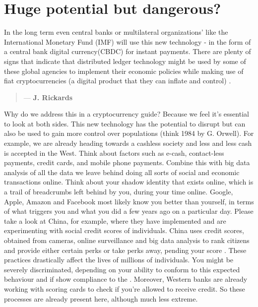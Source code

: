 \section{Huge potential but dangerous?}
In the long term even central banks or multilateral organizations' like the International Monetary Fund (IMF) will use this new technology - in the form of a central bank digital currency(CBDC) for instant payments. There are plenty of signs that indicate that distributed ledger technology might be used by some of these global agencies to implement their economic policies while making use of fiat cryptocurrencies (a digital product that they can inflate and control) \parencite{IMF_F&D}.


\begin{quotation}

      \textit{}
      \begin{flushright}
        \small{--- \textbf{J. Rickards}}
      \end{flushright}
    
\end{quotation}

\noindent Why do we address this in a cryptocurrency guide? Because we feel it's essential to look at both sides. This new technology has the potential to disrupt but can also be used to gain more control over populations (think 1984 by G. Orwell). For example, we are already heading towards a cashless society and less and less cash is accepted in the West. Think about factors such as e-cash, contact-less payments, credit cards, and mobile phone payments. Combine this with big data analysis of all the data we leave behind doing all sorts of social and economic transactions online. Think about your shadow identity that exists online, which is a trail of breadcrumbs left behind by you, during your time online. Google, Apple, Amazon and Facebook most likely know you better than yourself, in terms of what triggers you and what you did a few years ago on a particular day. Please take a look at China, for example, where they have implemented and are experimenting with social credit scores of individuals. China uses credit scores, obtained from cameras, online surveillance and big data analysis to rank citizens and provide either certain perks or take perks away, pending your score \parencite{chinasocialscores}. These practices drastically affect the lives of millions of individuals. You might be severely discriminated, depending on your ability to conform to this expected behaviour and if show compliance to the . Moreover, Western banks are already working with scoring cards to check if you're allowed to receive credit. So these processes are already present here, although much less extreme.\medskip


